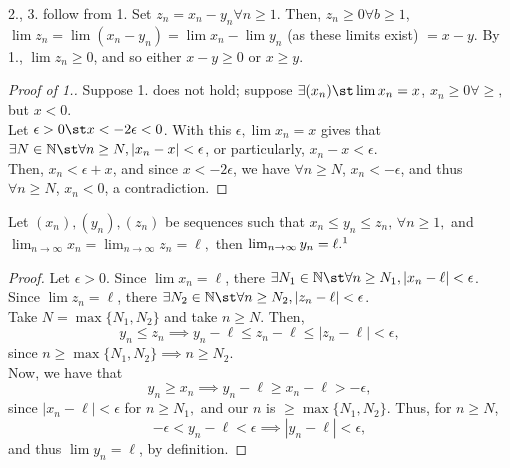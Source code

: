 \documentclass[12pt]{article}
\begin{document}
\begin{remark}
  2., 3. follow from 1. Set $z_n = x_n - y_n \forall n \geq 1$. Then, $z_n \geq 0 \forall b \geq 1$, $\lim z_n = \lim (x_n-y_n) = \lim x_n - \lim y_n$ (as these limits exist) $= x-y$. By 1., $\lim z_n \geq 0$, and so either $x - y \geq 0$ or $x \geq y$.
\end{remark}

\begin{proof}[Proof of 1.]
   Suppose 1. does not hold; suppose $\exists (x_n) \st \lim x_n = x$, $x_n \geq 0 \forall \geq,$ but $x <0$.\\
   Let $\epsilon > 0 \st x < -2 \epsilon < 0$. With this $\epsilon, \lim x_n = x$ gives that $\exists N \in \mathbb N \st \forall n \geq N, |x_n - x| < \epsilon$, or particularly, $x_n - x < \epsilon$.\\
   Then, $x_n < \epsilon + x$, and since $x < -2 \epsilon$, we have $\forall n \geq N$, $x_n < -\epsilon$, and thus $\forall n \geq N$, $x_n < 0$, a contradiction.
\end{proof}

\begin{theorem}\label{thm:squeezetheorem}
  Let $(x_n), (y_n), (z_n)$ be sequences such that \(x_n \leq y_n \leq z_n, \,\forall n \geq 1,\) and \(\lim_{n \to \infty} x_n = \lim_{n \to \infty} z_n = \ell,\) then \(\lim_{n \to \infty}y_n = \ell.\footnotemark\)
\end{theorem}

\begin{proof}
  Let $\epsilon > 0$. Since $\lim x_n = \ell$, there $\exists N_1 \in \mathbb{N} \st \forall n \geq N_1, |x_n - \ell| < \epsilon$.\\
  Since $\lim z_n = \ell$, there $\exists N_2 \in \mathbb{N} \st \forall n \geq N_2, |z_n - \ell| < \epsilon$.\\
  Take $N = \max \{N_1,N_2\}$ and take $n \geq N$. Then, \[y_n \leq z_n \implies y_n - \ell \leq z_n - \ell \leq |z_n - \ell| < \epsilon,\] since $n \geq \max\{N_1, N_2\} \implies n \geq N_2.$\\
  Now, we have that \[y_n \geq x_n \implies y_n - \ell \geq x_n - \ell > - \epsilon, \] since $|x_n - \ell| < \epsilon $ for $n \geq N_1,$ and our $n$ is $\geq \max\{N_1,N_2\}.$ Thus, for $n \geq N$, \[-\epsilon < y_n - \ell < \epsilon \implies |y_n - \ell| < \epsilon,\] and thus $\lim y_n = \ell$, by definition.
\end{proof}
\end{document}
